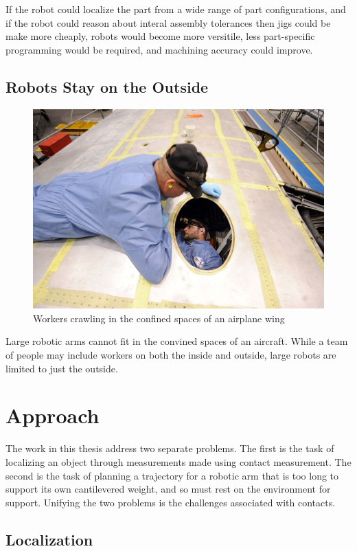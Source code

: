 \documentclass[../thesis.tex]{subfiles}
\begin{document}
If the robot could localize the part from a wide range of part configurations, and if the robot could reason about interal assembly tolerances then jigs could be make more cheaply, robots would become more versitile, less part-specific programming would be required, and machining accuracy could improve.

\subsection{Robots Stay on the Outside}

\begin{figure}
  \centering
  \label{fig:PeopleInWing}
  \includegraphics[width=.7\linewidth]{./Introduction/PeopleInWing.jpg}  
  \caption{Workers crawling in the confined spaces of an airplane wing}
\end{figure}

Large robotic arms cannot fit in the convined spaces of an aircraft.
While a team of people may include workers on both the inside and outside, large robots are limited to just the outside.



\section{Approach}
The work in this thesis address two separate problems. The first is the task of localizing an object through measurements made using contact measurement.
The second is the task of planning a trajectory for a robotic arm that is too long to support its own cantilevered weight, and so must rest on the environment for support.
Unifying the two problems is the challenges associated with contacts.

\subsection{Localization}
\end{document}
